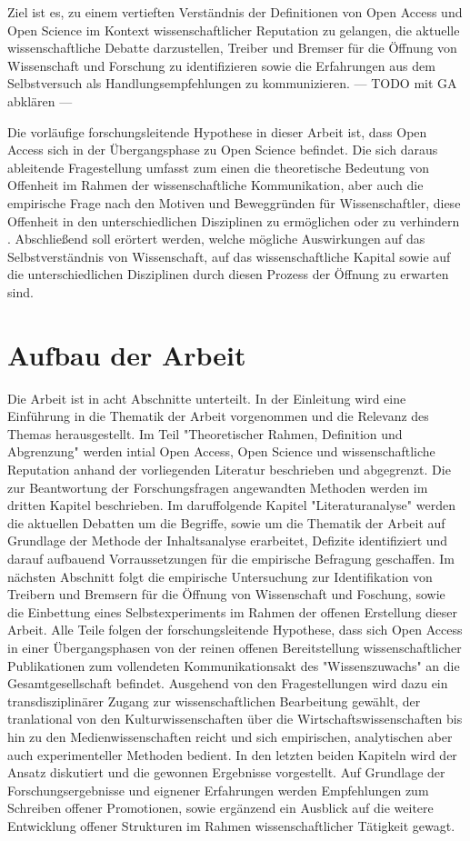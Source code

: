 Ziel ist es, zu einem vertieften Verständnis der Definitionen von Open Access und Open Science im Kontext wissenschaftlicher Reputation zu gelangen, die aktuelle wissenschaftliche Debatte darzustellen, Treiber und Bremser für die Öffnung von Wissenschaft und Forschung zu identifizieren sowie die Erfahrungen aus dem Selbstversuch als Handlungsempfehlungen zu kommunizieren. --- TODO mit GA abklären --- 

Die vorläufige forschungsleitende Hypothese in dieser Arbeit ist, dass Open Access sich in der Übergangsphase zu Open Science befindet. Die sich daraus ableitende Fragestellung umfasst zum einen die theoretische Bedeutung von Offenheit im Rahmen der wissenschaftliche Kommunikation, aber auch die empirische Frage nach den Motiven und Beweggründen für Wissenschaftler, diese Offenheit in den unterschiedlichen Disziplinen zu ermöglichen oder zu verhindern . Abschließend soll erörtert werden, welche mögliche Auswirkungen auf das Selbstverständnis von Wissenschaft, auf das wissenschaftliche Kapital sowie auf die unterschiedlichen Disziplinen durch diesen Prozess der Öffnung zu erwarten sind.

\section{Aufbau der Arbeit} 

Die Arbeit ist in acht Abschnitte unterteilt. In der Einleitung wird eine Einführung in die Thematik der Arbeit vorgenommen und die Relevanz des Themas herausgestellt. Im Teil "Theoretischer Rahmen, Definition und Abgrenzung" werden intial Open Access, Open Science und wissenschaftliche Reputation anhand der vorliegenden Literatur beschrieben und abgegrenzt. Die zur Beantwortung der Forschungsfragen angewandten Methoden werden im dritten Kapitel beschrieben. Im daruffolgende Kapitel "Literaturanalyse" werden die aktuellen Debatten um die Begriffe, sowie um die Thematik der Arbeit auf Grundlage der Methode der Inhaltsanalyse erarbeitet, Defizite identifiziert und darauf aufbauend Vorraussetzungen für die empirische Befragung geschaffen. Im nächsten Abschnitt folgt die empirische Untersuchung zur Identifikation von Treibern und Bremsern für die Öffnung von Wissenschaft und Foschung, sowie die Einbettung eines Selbstexperiments im Rahmen der offenen Erstellung dieser Arbeit. Alle Teile folgen der forschungsleitende Hypothese, dass sich Open Access in einer Übergangsphasen von der reinen offenen Bereitstellung wissenschaftlicher Publikationen zum vollendeten Kommunikationsakt des "Wissenszuwachs" \cite{Luhmann1998} an die Gesamtgesellschaft befindet. Ausgehend von den Fragestellungen wird dazu ein transdisziplinärer Zugang zur wissenschaftlichen Bearbeitung gewählt, der tranlational von den Kulturwissenschaften über die Wirtschaftswissenschaften bis hin zu den Medienwissenschaften reicht und sich empirischen, analytischen aber auch experimenteller Methoden bedient. In den letzten beiden Kapiteln wird der Ansatz diskutiert und die gewonnen Ergebnisse vorgestellt. Auf Grundlage der Forschungsergebnisse und eignener Erfahrungen werden Empfehlungen zum Schreiben offener Promotionen, sowie ergänzend ein Ausblick auf die weitere Entwicklung offener Strukturen im Rahmen wissenschaftlicher Tätigkeit gewagt.
